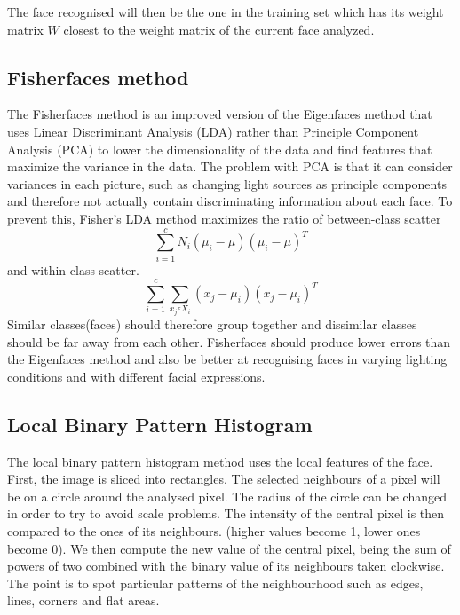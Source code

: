 The face recognised will then be the one in the training set which has its weight matrix $W$ closest to the weight matrix of the current face analyzed. 

\subsection{Fisherfaces method}

The Fisherfaces method is an improved version of the Eigenfaces method that uses Linear Discriminant Analysis (LDA) rather than Principle Component Analysis (PCA) to lower the dimensionality of the data and find features that maximize the variance in the data. The problem with PCA is that it can consider variances in each picture, such as changing light sources as principle components and therefore not actually contain discriminating information about each face. To prevent this, Fisher's LDA method maximizes the ratio of between-class scatter 
\begin{equation}
	\sum\limits_{i=1}^{c}N_{i}(\mu_{i}-\mu)(\mu_{i}-\mu)^T
\end{equation}
and within-class scatter.
\begin{equation}
	\sum\limits_{i=1}^{c}\sum\limits_{x_{j}\epsilon X_{i}}^{}(x_{j}-\mu_{i})(x_{j}-\mu_{i})^T
\end{equation}
Similar classes(faces) should therefore group together and dissimilar classes should be far away from each other.
Fisherfaces should produce lower errors than the Eigenfaces method and also be better at recognising faces in varying lighting conditions and with different facial expressions.\cite{Eigenfaces_vs_Fisherfaces}

\subsection{Local Binary Pattern Histogram}

The local binary pattern histogram method uses the local features of the face. First, the image is sliced into rectangles.
The selected neighbours of a pixel will be on a circle around the analysed pixel. The radius of the circle can be changed in order to try to avoid scale problems.
The intensity of the central pixel is then compared to the ones of its neighbours. (higher values become 1, lower ones become 0).
We then compute the new value of the central pixel, being the sum of powers of two combined with the binary value of its neighbours taken clockwise. The point is to spot particular patterns of the neighbourhood such as edges, lines, corners and flat areas.


